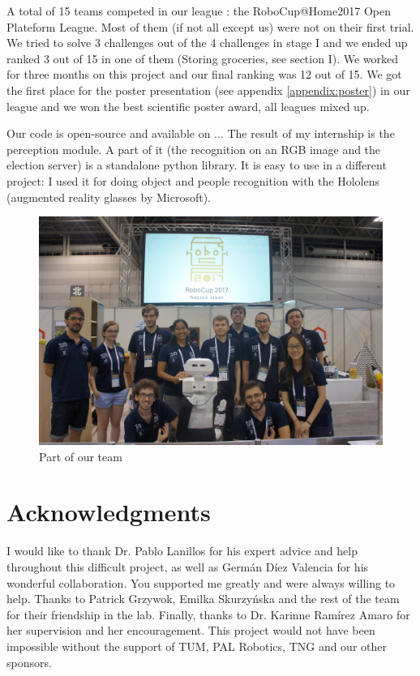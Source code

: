 \documentclass[a4paper, twocolumn]{article}
\begin{document}
    A total of 15 teams competed in our league : the RoboCup@Home2017 Open Plateform League. Most of them (if not all except us) were not on their first trial. We tried to solve 3 challenges out of the 4 challenges in stage I and we ended up ranked 3 out of 15 in one of them (Storing groceries, see section I). We worked for three months on this project and our final ranking was 12 out of 15. We got the first place for the poster presentation (see appendix \ref{appendix:poster}) in our league and we won the best scientific poster award, all leagues mixed up.

    Our code is open-source and available on ... The result of my internship is the perception module. A part of it (the recognition on an RGB image and the election server) is a standalone python library. It is easy to use in a different project: I used it for doing object and people recognition with the Hololens (augmented reality glasses by Microsoft).

    \begin{figure}[!t]
        \includegraphics[width=\columnwidth]{../img/team.jpg}
        \caption{Part of our team}
        \label{team}
    \end{figure}

    \section*{Acknowledgments}

    I would like to thank Dr. Pablo Lanillos for his expert advice and help throughout this difficult project, as well as Germ\'{a}n D\'{i}ez Valencia for his wonderful collaboration. You supported me greatly and were always willing to help. Thanks to Patrick Grzywok, Emilka Skurzy\'{n}ska and the rest of the team for their friendship in the lab. Finally, thanks to Dr. Karinne Ram\'{i}rez Amaro for her supervision and her encouragement. This project would not have been impossible without the support of TUM, PAL Robotics, TNG and our other sponsors.
\end{document}
